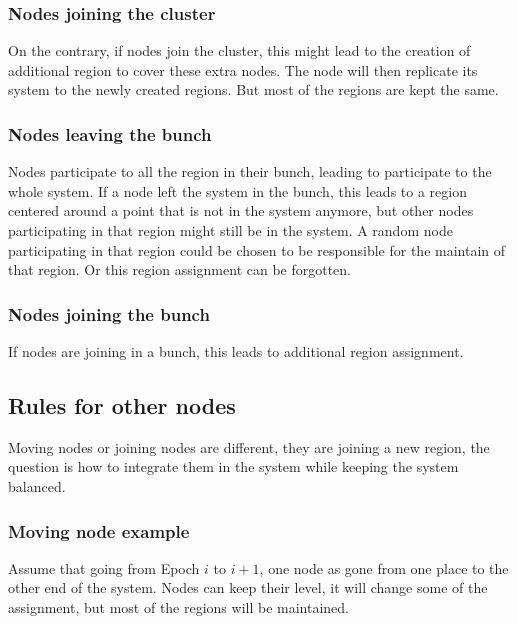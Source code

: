 \documentclass[a4paper,11pt,oneside]{report}
\begin{document}
\subsubsection{Nodes joining the cluster} 
On the contrary, if nodes join the cluster, this might lead to the creation of
additional region to cover these extra nodes. The node will then replicate its
system to the newly created regions. But most of the regions are kept the same.

\subsubsection{Nodes leaving the bunch} 
Nodes participate to all the region in their bunch, leading to participate to
the whole system. If a node left the system in the bunch,  this leads to a
region centered around a point that is not in the system anymore, but other
nodes participating in that region might still be in the system. A random node
participating in that region could be chosen to be responsible for the maintain
of that region.  Or this region assignment can be forgotten. 

\subsubsection{Nodes joining the bunch} 
If nodes are joining in a bunch, this leads to additional region assignment. 

\subsection{Rules for other nodes}
Moving nodes or joining nodes are different, they are joining a new region, the question is how to integrate them in the system while keeping the system balanced. 

\subsubsection{Moving node example}
Assume that going from Epoch $i$ to $i+1$, one node as gone from one place to the other end of the system. 
Nodes can keep their level, it will change some of the assignment, but most of the regions will be maintained. 
\end{document}
